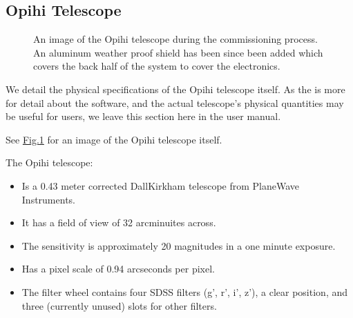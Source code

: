 \documentclass[letterpaper,11pt,english]{sphinxmanual}
\begin{document}
\sphinxstepscope


\subsection{Opihi Telescope}
\label{\detokenize{user/opihi_telescope:opihi-telescope}}\label{\detokenize{user/opihi_telescope:user-opihi-telescope}}\label{\detokenize{user/opihi_telescope::doc}}
\begin{figure}[H]
\centering
\capstart

\noindent{}
\caption{An image of the Opihi telescope during the commissioning process. An
aluminum weather proof shield has been since been added which covers the
back half of the system to cover the electronics.}\label{\detokenize{user/opihi_telescope:id1}}\label{\detokenize{user/opihi_telescope:figure-opihi-telescope-no-shield}}\end{figure}

\sphinxAtStartPar
We detail the physical specifications of the Opihi telescope itself. As the
{\hyperref[\detokenize{technical/index:technical-index}]{}} is more for detail about the software, and the
actual telescope’s physical quantities may be useful for users, we leave this
section here in the user manual.

\sphinxAtStartPar
See \hyperref[\detokenize{user/opihi_telescope:figure-opihi-telescope-no-shield}]{Fig.\@ \ref{\detokenize{user/opihi_telescope:figure-opihi-telescope-no-shield}}} for an image of the Opihi
telescope itself.

\sphinxAtStartPar
The Opihi telescope:
\begin{itemize}
\item {} 
\sphinxAtStartPar
Is a 0.43 meter corrected Dall\sphinxhyphen{}Kirkham telescope from PlaneWave Instruments.

\item {} 
\sphinxAtStartPar
It has a field of view of 32 arcminuites across.

\item {} 
\sphinxAtStartPar
The sensitivity is approximately 20 magnitudes in a one minute exposure.

\item {} 
\sphinxAtStartPar
Has a pixel scale of 0.94 arcseconds per pixel.

\item {} 
\sphinxAtStartPar
The filter wheel contains four SDSS filters (g’, r’, i’, z’), a clear position, and three (currently unused) slots for other filters.

\end{itemize}
\end{document}
